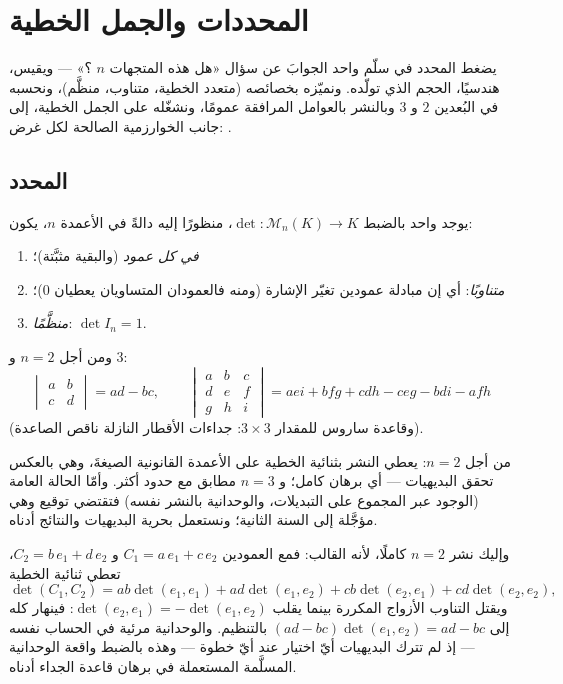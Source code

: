 \chapter{المحددات والجمل الخطية}\label{ch:b1:det}

يضغط المحدد في سلّم واحد الجوابَ عن سؤال «هل هذه
المتجهات $n$ ؟» --- ويقيس، هندسيًا، الحجم
الذي تولّده. ونميّزه بخصائصه (متعدد الخطية، متناوب،
منظَّم)، ونحسبه في البُعدين $2$ و $3$ وبالنشر
بالعوامل المرافقة عمومًا، ونشغّله على الجمل الخطية،
إلى جانب الخوارزمية الصالحة لكل غرض: .

\section{المحدد}

\begin{theorem}[التمييز]\label{thm:b1:det:def}
يوجد  واحد بالضبط $\det \colon \mathcal{M}_n(K) \to K$،
منظورًا إليه دالةً في الأعمدة $n$، يكون:
\begin{enumerate}
  \item \emph{ في كل عمود} (والبقية مثبَّتة)؛
  \item \emph{متناوبًا}: أي إن مبادلة عمودين تغيّر الإشارة
        (ومنه فالعمودان المتساويان يعطيان $0$)؛
  \item \emph{منظَّمًا}: $\det I_n = 1$.
\end{enumerate}
ومن أجل $n = 2$ و $3$:
\[
\begin{vmatrix} a & b\\ c & d\end{vmatrix} = ad - bc,
\qquad
\begin{vmatrix} a & b & c\\ d & e & f\\ g & h & i\end{vmatrix}
= aei + bfg + cdh - ceg - bdi - afh
\]
(وقاعدة ساروس للمقدار $3 \times 3$: جداءات الأقطار النازلة
ناقص الصاعدة).
\end{theorem}
\admitted

\begin{remark}
من أجل $n = 2$: يعطي النشر بثنائية الخطية على الأعمدة القانونية
الصيغةَ، وهي بالعكس تحقق البديهيات --- أي برهان كامل؛ و $n = 3$
مطابق مع حدود أكثر. وأمّا الحالة العامة
(الوجود عبر المجموع على التبديلات، والوحدانية بالنشر نفسه)
فتقتضي توقيع  وهي مؤجَّلة إلى السنة الثانية؛ ونستعمل
بحرية البديهيات والنتائج
أدناه.

وإليك نشر $n = 2$ كاملًا، لأنه القالب: فمع
العمودين $C_1 = a\,e_1 + c\,e_2$ و $C_2 = b\,e_1 + d\,e_2$،
تعطي ثنائية الخطية
\[
\det(C_1, C_2) = ab\det(e_1, e_1) + ad\det(e_1, e_2)
+ cb\det(e_2, e_1) + cd\det(e_2, e_2),
\]
ويقتل التناوب الأزواج المكررة بينما يقلب
$\det(e_2, e_1) = -\det(e_1, e_2)$: فينهار  كله إلى
$(ad - bc)\det(e_1, e_2) = ad - bc$ بالتنظيم. والوحدانية
مرئية في الحساب نفسه --- إذ لم تترك البديهيات أيّ
اختيار عند أيّ خطوة --- وهذه بالضبط واقعة الوحدانية المسلَّمة
المستعملة في برهان قاعدة الجداء أدناه.
\end{remark}

